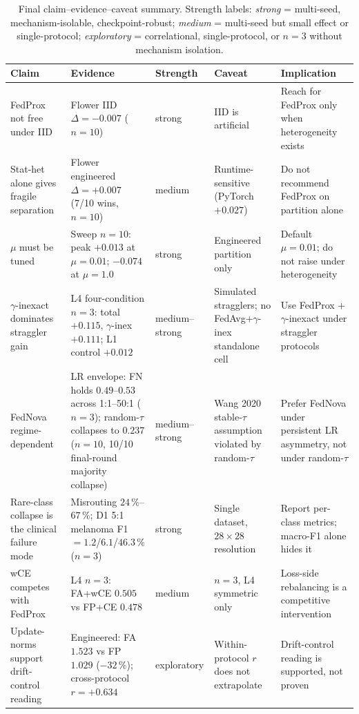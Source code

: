 \documentclass[11pt,a4paper]{report}
\begin{document}
\begin{table}[H]
\centering
\small
\caption{Final claim--evidence--caveat summary. Strength labels: \emph{strong}
= multi-seed, mechanism-isolable, checkpoint-robust; \emph{medium} =
multi-seed but small effect or single-protocol; \emph{exploratory} =
correlational, single-protocol, or $n=3$ without mechanism isolation.}
\label{tab:final-claims}
\begin{tabular}{p{3.0cm}p{3.6cm}p{1.6cm}p{2.6cm}p{2.6cm}}
\hline
Claim & Evidence & Strength & Caveat & Implication \\
\hline
FedProx not free under IID & Flower IID $\Delta = -0.007$ ($n=10$) & strong & IID is artificial & Reach for FedProx only when heterogeneity exists \\
Stat-het alone gives fragile separation & Flower engineered $\Delta = +0.007$ (7/10 wins, $n=10$) & medium & Runtime-sensitive (PyTorch $+0.027$) & Do not recommend FedProx on partition alone \\
$\mu$ must be tuned & Sweep $n=10$: peak $+0.013$ at $\mu = 0.01$; $-0.074$ at $\mu = 1.0$ & strong & Engineered partition only & Default $\mu = 0.01$; do not raise under heterogeneity \\
$\gamma$-inexact dominates straggler gain & L4 four-condition $n=3$: total $+0.115$, $\gamma$-inex $+0.111$; L1 control $+0.012$ & medium--strong & Simulated stragglers; no FedAvg+$\gamma$-inex standalone cell & Use FedProx + $\gamma$-inexact under straggler protocols \\
FedNova regime-dependent & LR envelope: FN holds $0.49$--$0.53$ across 1:1--50:1 ($n=3$); random-$\tau$ collapses to $0.237$ ($n=10$, 10/10 final-round majority collapse) & medium--strong & Wang 2020 stable-$\tau$ assumption violated by random-$\tau$ & Prefer FedNova under persistent LR asymmetry, not under random-$\tau$ \\
Rare-class collapse is the clinical failure mode & Misrouting $24\,\%$--$67\,\%$; D1 5:1 melanoma F1 $= 1.2$/$6.1$/$46.3\,\%$ ($n=3$) & strong & Single dataset, $28 \times 28$ resolution & Report per-class metrics; macro-F1 alone hides it \\
wCE competes with FedProx & L4 $n=3$: FA+wCE $0.505$ vs FP+CE $0.478$ & medium & $n=3$, L4 symmetric only & Loss-side rebalancing is a competitive intervention \\
Update-norms support drift-control reading & Engineered: FA $1.523$ vs FP $1.029$ ($-32\,\%$); cross-protocol $r = +0.634$ & exploratory & Within-protocol $r$ does not extrapolate & Drift-control reading is supported, not proven \\
\hline
\end{tabular}
\end{table}
\end{document}
